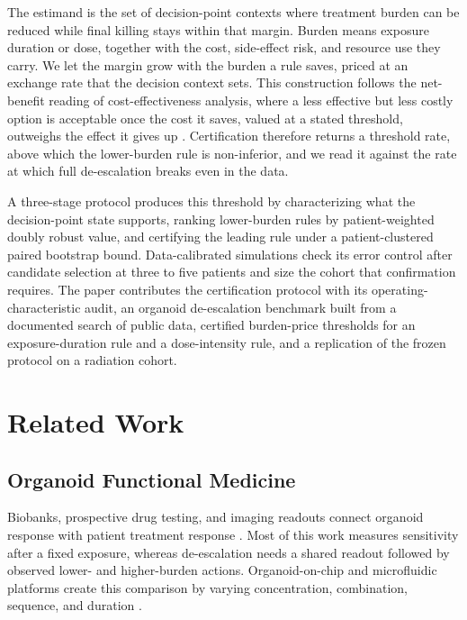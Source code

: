 \documentclass[conference]{IEEEtran}
\begin{document}
The estimand is the set of decision-point contexts where treatment burden can be reduced while final killing stays within that margin. Burden means exposure duration or dose, together with the cost, side-effect risk, and resource use they carry. We let the margin grow with the burden a rule saves, priced at an exchange rate that the decision context sets. This construction follows the net-benefit reading of cost-effectiveness analysis, where a less effective but less costly option is acceptable once the cost it saves, valued at a stated threshold, outweighs the effect it gives up \cite{stinnett1998, fenwick2001}. Certification therefore returns a threshold rate, above which the lower-burden rule is non-inferior, and we read it against the rate at which full de-escalation breaks even in the data.

A three-stage protocol produces this threshold by characterizing what the decision-point state supports, ranking lower-burden rules by patient-weighted doubly robust value, and certifying the leading rule under a patient-clustered paired bootstrap bound. Data-calibrated simulations check its error control after candidate selection at three to five patients and size the cohort that confirmation requires. The paper contributes the certification protocol with its operating-characteristic audit, an organoid de-escalation benchmark built from a documented search of public data, certified burden-price thresholds for an exposure-duration rule and a dose-intensity rule, and a replication of the frozen protocol on a radiation cohort.

\section{Related Work}

\subsection{Organoid Functional Medicine}

Biobanks, prospective drug testing, and imaging readouts connect organoid response with patient treatment response \cite{vlachogiannis2018, ooft2021, spiller2021}. Most of this work measures sensitivity after a fixed exposure, whereas de-escalation needs a shared readout followed by observed lower- and higher-burden actions. Organoid-on-chip and microfluidic platforms create this comparison by varying concentration, combination, sequence, and duration \cite{man2024, schuster2020, wangclevers2025}.
\end{document}
